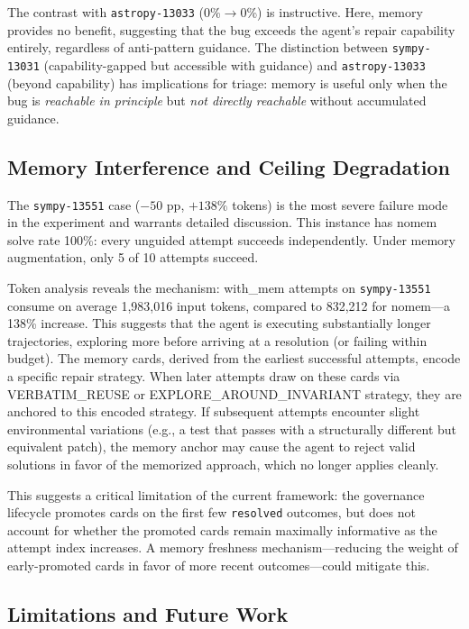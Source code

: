 \documentclass{article}
\begin{document}
The contrast with \texttt{astropy-13033} (0\%$\to$0\%) is instructive. Here, memory provides no benefit, suggesting that the bug exceeds the agent's repair capability entirely, regardless of anti-pattern guidance. The distinction between \texttt{sympy-13031} (capability-gapped but accessible with guidance) and \texttt{astropy-13033} (beyond capability) has implications for triage: memory is useful only when the bug is \emph{reachable in principle} but \emph{not directly reachable} without accumulated guidance.

\subsection{Memory Interference and Ceiling Degradation}

The \texttt{sympy-13551} case ($-50$ pp, $+138\%$ tokens) is the most severe failure mode in the experiment and warrants detailed discussion. This instance has nomem solve rate 100\%: every unguided attempt succeeds independently. Under memory augmentation, only 5 of 10 attempts succeed.

Token analysis reveals the mechanism: with\_mem attempts on \texttt{sympy-13551} consume on average 1,983,016 input tokens, compared to 832,212 for nomem---a 138\% increase. This suggests that the agent is executing substantially longer trajectories, exploring more before arriving at a resolution (or failing within budget). The memory cards, derived from the earliest successful attempts, encode a specific repair strategy. When later attempts draw on these cards via VERBATIM\_REUSE or EXPLORE\_AROUND\_INVARIANT strategy, they are anchored to this encoded strategy. If subsequent attempts encounter slight environmental variations (e.g., a test that passes with a structurally different but equivalent patch), the memory anchor may cause the agent to reject valid solutions in favor of the memorized approach, which no longer applies cleanly.

This suggests a critical limitation of the current framework: the governance lifecycle promotes cards on the first few \texttt{resolved} outcomes, but does not account for whether the promoted cards remain maximally informative as the attempt index increases. A memory freshness mechanism---reducing the weight of early-promoted cards in favor of more recent outcomes---could mitigate this.

\subsection{Limitations and Future Work}
\end{document}
